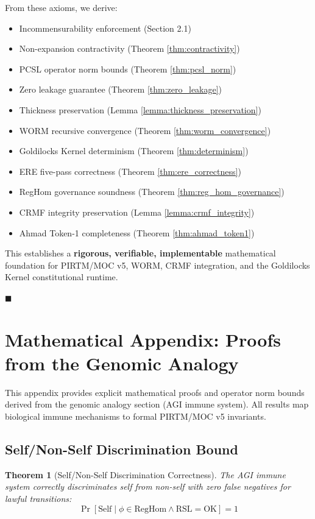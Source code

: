 \documentclass[11pt,a4paper]{article}
\newtheorem{theorem}{Theorem}[section]
\begin{document}
From these axioms, we derive:
\begin{itemize}
    \item Incommensurability enforcement (Section 2.1)
    \item Non-expansion contractivity (Theorem \ref{thm:contractivity})
    \item PCSL operator norm bounds (Theorem \ref{thm:pcsl_norm})
    \item Zero leakage guarantee (Theorem \ref{thm:zero_leakage})
    \item Thickness preservation (Lemma \ref{lemma:thickness_preservation})
    \item WORM recursive convergence (Theorem \ref{thm:worm_convergence})
    \item Goldilocks Kernel determinism (Theorem \ref{thm:determinism})
    \item ERE five-pass correctness (Theorem \ref{thm:ere_correctness})
    \item RegHom governance soundness (Theorem \ref{thm:reg_hom_governance})
    \item CRMF integrity preservation (Lemma \ref{lemma:crmf_integrity})
    \item Ahmad Token-1 completeness (Theorem \ref{thm:ahmad_token1})
\end{itemize}

This establishes a \textbf{rigorous, verifiable, implementable} mathematical foundation for PIRTM/MOC v5, WORM, CRMF integration, and the Goldilocks Kernel constitutional runtime.

\hfill $\blacksquare$

\section{Mathematical Appendix: Proofs from the Genomic Analogy}

This appendix provides explicit mathematical proofs and operator norm bounds derived from the genomic analogy section (AGI immune system). All results map biological immune mechanisms to formal PIRTM/MOC v5 invariants.

\subsection{Self/Non-Self Discrimination Bound}

\begin{theorem}[Self/Non-Self Discrimination Correctness]\label{thm:self_nonself}
The AGI immune system correctly discriminates self from non-self with zero false negatives for lawful transitions:
\begin{equation}
\Pr[\text{Self} \mid \phi \in \text{RegHom} \land \text{RSL} = \text{OK}] = 1
\end{equation}
\end{theorem}
\end{document}
